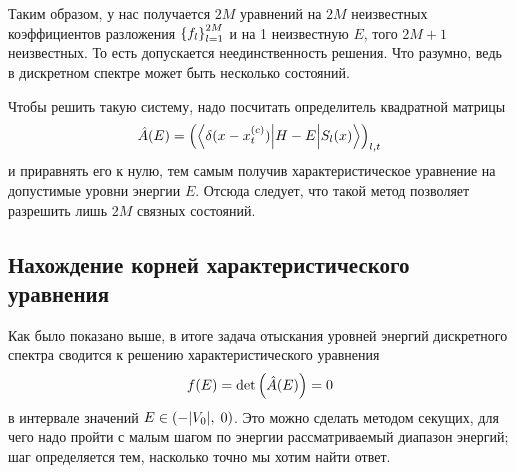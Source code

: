 \documentclass[10pt]{article}
\begin{document}
Таким образом, у нас получается $2M$ уравнений на $2M$ неизвестных коэффициентов разложения $\qty{f_l}_{l=1}^{2M}$ и на 1 неизвестную $E$, того $2M+1$ неизвестных. То есть допускается неединственность решения. Что разумно, ведь в дискретном спектре может быть несколько состояний.

Чтобы решить такую систему, надо посчитать определитель квадратной матрицы
\begin{equation}
    \hat A(E) = \qty(\mel**{\delta(x-x^{(c)}_t)}{H-E}{S_{l}(x)})_{l,t}
\end{equation}
и приравнять его к нулю, тем самым получив характеристическое уравнение на допустимые уровни энергии $E$. Отсюда следует, что такой метод позволяет разрешить лишь $2M$ связных состояний.

\subsection{Нахождение корней характеристического уравнения}

Как было показано выше, в итоге задача отыскания уровней энергий дискретного спектра сводится к решению характеристического уравнения
\begin{equation}
    f(E) = \det\qty(\hat A(E)) = 0
\end{equation}
в интервале значений $E \in \qty(-\abs{V_0},\; 0)$. Это можно сделать методом секущих, для чего надо пройти с малым шагом по энергии рассматриваемый диапазон энергий; шаг определяется тем, насколько точно мы хотим найти ответ.
\end{document}
